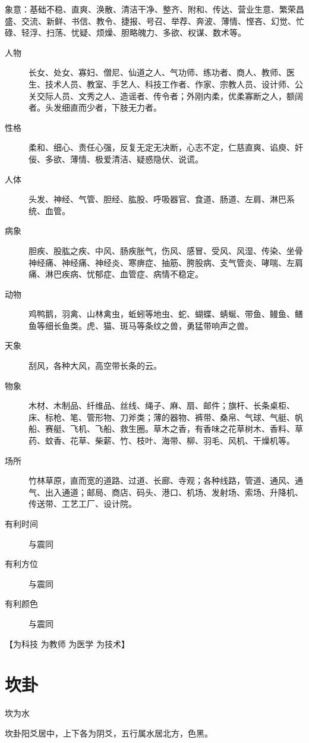 \documentclass[12pt,oneside]{book}
\begin{document}
象意：基础不稳、直爽、涣散、清洁干净、整齐、附和、传达、营业生意、繁荣昌盛、交流、新鲜、书信、教令、捷报、号召、举荐、奔波、薄情、悭吝、幻觉、忙碌、轻浮、扫荡、忧疑、烦燥、胆略魄力、多欲、权谋、数术等。


\begin{description}
\item[人物] 长女、处女、寡妇、僧尼、仙道之人、气功师、练功者、商人、教师、医生、技术人员、教室、手艺人、科技工作者、作家、宗教人员、设计师、公关交际人员、文秀之人、造谣者、传令者；外刚内柔，优柔寡断之人，额阔者。头发细直而少者，下肢无力者。
\item[性格] 柔和、细心、责任心强，反复无定无决断，心志不定，仁慈直爽、谄庾、奸佞、多欲、薄情、极爱清洁、疑惑隐伏、说谎。
\item[人体] 头发、神经、气管、胆经、肱股、呼吸器官、食道、肠道、左肩、淋巴系统、血管。
\item[病象] 胆疾、股肱之疾、中风、肠疾胀气，伤风、感冒、受风、风湿、传染、坐骨神经痛、神经痛、神经炎、寒痹症、抽筋、胯股病、支气管炎、哮喘、左肩痛、淋巴疾病、忧郁症、血管症、病情不稳定。
\item[动物] 鸡鸭鹅，羽禽、山林禽虫，蚯蚓等地虫、蛇、蝴蝶、蜻蜒、带鱼、鳗鱼、鳝鱼等细长鱼类。虎、猫、斑马等条纹之兽，勇猛带响声之兽。
\item[天象] 刮风，各种大风，高空带长条的云。
\item[物象] 木材、木制品、纤维品、丝线、绳子、麻、扇、邮件；旗杆、长条桌柜、床、标枪、笔、管形物、刀斧类；薄的器物、裤带、桑帛、气球、气艇、帆船、赛艇、飞机、飞船、救生圈。草木之香，有香味之花草树木、香料、草药、蚊香、花草、柴薪、竹、枝叶、海带、柳、羽毛、风机、干燥机等。
\item[场所] 竹林草原，直而宽的道路、过道、长廊、寺观；各种线路，管道、通风、通气、出入通道；邮局、商店、码头、港口、机场、发射场、索场、升降机、传送带、工艺工厂、设计院。
\item[有利时间] 与震同
\item[有利方位] 与震同
\item[有利颜色] 与震同
\end{description}



【为科技 为教师 为医学 为技术】


\section{坎卦}
坎为水

坎卦阳爻居中，上下各为阴爻，五行属水居北方，色黑。
\end{document}
